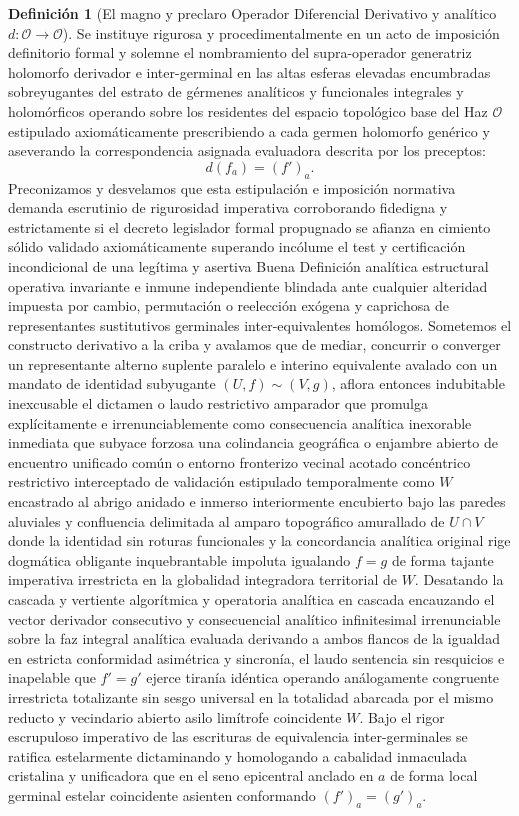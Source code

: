 \documentclass[11pt,a4paper]{article}
\theoremstyle{definition}
\newtheorem{definicion}{Definición}[section]
\theoremstyle{remark}
\numberwithin{equation}{section}
\begin{document}
\begin{definicion}[El magno y preclaro Operador Diferencial Derivativo y analítico $d: \mathcal{O} \to \mathcal{O}$]
Se instituye rigurosa y procedimentalmente en un acto de imposición definitorio formal y solemne el nombramiento del supra-operador generatriz holomorfo derivador e inter-germinal en las altas esferas elevadas encumbradas sobreyugantes del estrato de gérmenes analíticos y funcionales integrales y holomórficos operando sobre los residentes del espacio topológico base del Haz $\mathcal{O}$ estipulado axiomáticamente prescribiendo a cada germen holomorfo genérico y aseverando la correspondencia asignada evaluadora descrita por los preceptos: 
\begin{equation}
d(f_a) = (f')_a.
\end{equation}
Preconizamos y desvelamos que esta estipulación e imposición normativa demanda escrutinio de rigurosidad imperativa corroborando fidedigna y estrictamente si el decreto legislador formal propugnado se afianza en cimiento sólido validado axiomáticamente superando incólume el test y certificación incondicional de una legítima y asertiva Buena Definición analítica estructural operativa invariante e inmune independiente blindada ante cualquier alteridad impuesta por cambio, permutación o reelección exógena y caprichosa de representantes sustitutivos germinales inter-equivalentes homólogos. Sometemos el constructo derivativo a la criba y avalamos que de mediar, concurrir o converger un representante alterno suplente paralelo e interino equivalente avalado con un mandato de identidad subyugante $(U, f) \sim (V, g)$, aflora entonces indubitable inexcusable el dictamen o laudo restrictivo amparador que promulga explícitamente e irrenunciablemente como consecuencia analítica inexorable inmediata que subyace forzosa una colindancia geográfica o enjambre abierto de encuentro unificado común o entorno fronterizo vecinal acotado concéntrico restrictivo interceptado de validación estipulado temporalmente como $W$ encastrado al abrigo anidado e inmerso interiormente encubierto bajo las paredes aluviales y confluencia delimitada al amparo topográfico amurallado de $U \cap V$ donde la identidad sin roturas funcionales y la concordancia analítica original rige dogmática obligante inquebrantable impoluta igualando $f = g$ de forma tajante imperativa irrestricta en la globalidad integradora territorial de $W$. Desatando la cascada y vertiente algorítmica y operatoria analítica en cascada encauzando el vector derivador consecutivo y consecuencial analítico infinitesimal irrenunciable sobre la faz integral analítica evaluada derivando a ambos flancos de la igualdad en estricta conformidad asimétrica y sincronía, el laudo sentencia sin resquicios e inapelable que $f' = g'$ ejerce tiranía idéntica operando análogamente congruente irrestricta totalizante sin sesgo universal en la totalidad abarcada por el mismo reducto y vecindario abierto asilo limítrofe coincidente $W$. Bajo el rigor escrupuloso imperativo de las escrituras de equivalencia inter-germinales se ratifica estelarmente dictaminando y homologando a cabalidad inmaculada cristalina y unificadora que en el seno epicentral anclado en $a$ de forma local germinal estelar coincidente asienten conformando $(f')_a = (g')_a$.

\end{definicion}
\end{document}
